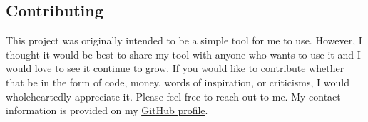 \documentclass[
	a4paper, %
	12pt, %
]{CSSullivanBusinessReport}
\begin{document}
\begin{fullwidth}
\section{Contributing}
This project was originally intended to be a simple tool for me to use. However, I thought it would be best to share my tool with anyone who wants to use it and I would love to see it continue to grow. If you would like to contribute whether that be in the form of  code, money, words of inspiration, or criticisms, I would wholeheartedly appreciate it. Please feel free to reach out to me. My contact information is  provided on my \href{https://github.com/MaybeMarq}{\underline{GitHub profile}}.

\newpage

\end{fullwidth}





\printbibliography
\end{document}
